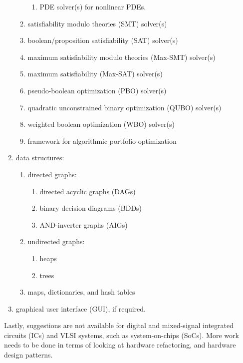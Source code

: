 \documentclass[letter,12pt]{article}
\begin{document}
\begin{enumerate}
\begin{enumerate}
		\begin{enumerate} \itemsep -2pt
		\item PDE solver(s) for nonlinear PDEs.
		\end{enumerate}
	\item satisfiability modulo theories (SMT) solver(s)
	\item boolean/proposition satisfiability (SAT) solver(s)
	\item maximum satisfiability modulo theories (Max-SMT) solver(s)
	\item maximum satisfiability (Max-SAT) solver(s)
	\item pseudo-boolean optimization (PBO) solver(s)
	\item quadratic unconstrained binary optimization (QUBO) solver(s)
	\item weighted boolean optimization (WBO) solver(s)
	\item framework for algorithmic portfolio optimization
	\end{enumerate}
\item data structures: \vspace{-0.3cm}
	\begin{enumerate} \itemsep -2pt
	\item directed graphs: \vspace{-0.2cm}
		\begin{enumerate} \itemsep -2pt
		\item directed acyclic graphs (DAGs)
		\item binary decision diagrams (BDDs)
		\item AND-inverter graphs (AIGs)
		\end{enumerate}
	\item undirected graphs: \vspace{-0.2cm}
		\begin{enumerate} \itemsep -2pt
		\item heaps
		\item trees
		\end{enumerate}
	\item maps, dictionaries, and hash tables
	\end{enumerate}
\item graphical user interface (GUI), if required.
\end{enumerate}




Lastly, suggestions are not available for digital and mixed-signal integrated circuits (ICs) and VLSI systems, such as system-on-chips (SoCs). More work needs to be done in terms of looking at hardware refactoring, and hardware design patterns.
\end{document}
